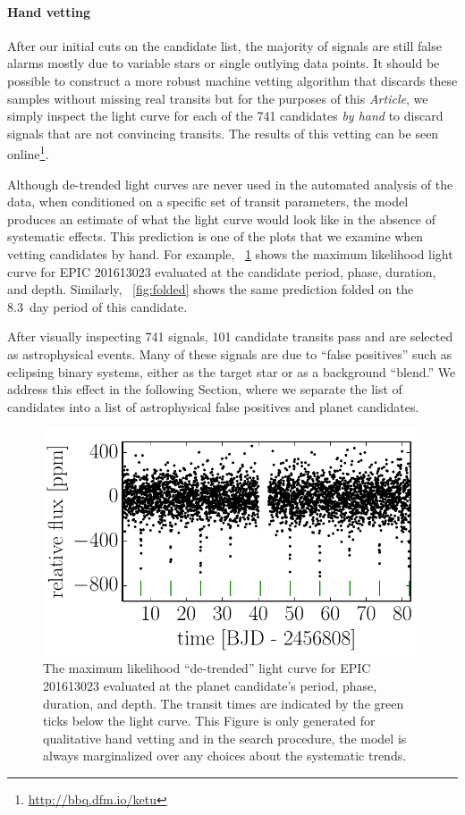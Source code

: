 \documentclass[12pt,preprint]{aastex}
\newcommand{\paper}{\textsl{Article}}
\newcommand{\figref}[1]{\ref{fig:#1}}
\newcommand{\Fig}[1]{\figurename~\figref{#1}}
\newcommand{\fig}[1]{\Fig{#1}}
\newcommand{\figlabel}[1]{\label{fig:#1}}
\newcommand{\sectionname}{Section}
\newcommand{\datareleaseurl}{{\url{http://bbq.dfm.io/ketu}}}
\begin{document}
\paragraph{Hand vetting}

After our initial cuts on the candidate list, the majority of signals are
still false alarms mostly due to variable stars or single outlying data
points.
It should be possible to construct a more robust machine vetting algorithm
that discards these samples without missing real transits but for the purposes
of this \paper, we simply inspect the light curve for each of the 741
candidates \emph{by hand} to discard signals that are not convincing transits.
The results of this vetting can be seen online\footnote{\datareleaseurl}.

Although de-trended light curves are never used in the automated analysis of
the data, when conditioned on a specific set of transit parameters, the model
produces an estimate of what the light curve would look like in the absence
of systematic effects.
This prediction is one of the plots that we examine when vetting candidates
by hand.
For example, \fig{de-trended} shows the maximum likelihood light curve for
EPIC 201613023 evaluated at the candidate period, phase, duration, and depth.
Similarly, \fig{folded} shows the same prediction folded on the 8.3~day
period of this candidate.

After visually inspecting 741 signals, 101 candidate transits pass and are
selected as astrophysical events.
Many of these signals are due to ``false positives'' such as eclipsing binary
systems, either as the target star or as a background ``blend.'' We address
this effect in the following \sectionname, where we separate the list of
candidates into a list of astrophysical false positives and planet candidates.

\begin{figure}[p]
\begin{center}
\includegraphics{figures/de-trended.pdf}
\end{center}
\caption{%
The maximum likelihood ``de-trended'' light curve for EPIC 201613023
evaluated at the planet candidate's period, phase, duration, and depth.
The transit times are indicated by the green ticks below the light curve.
This Figure is only generated for qualitative hand vetting and in the search
procedure, the model is always marginalized over any choices about the
systematic trends.
\figlabel{de-trended}}
\end{figure}
\end{document}

